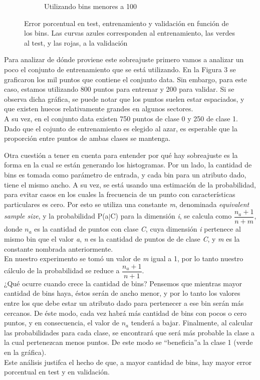 \documentclass[12pt, a4paper]{article}
\begin{document}
\begin{figure}
\begin{subfigure}[b]{0.45\textwidth}
        \caption{Utilizando bins menores a 100}
    \end{subfigure}
    \caption{Error porcentual en test, entrenamiento y validación en función de los bins. Las curvas azules corresponden al entrenamiento, las verdes al test, y las rojas, a la validación}
\end{figure}

\bigskip

Para analizar de dónde proviene este sobreajuste primero vamos a analizar un poco el conjunto de entrenamiento que se está utilizando. En la Figura 3 se graficaron los mil puntos que contiene el conjunto data. Sin embargo, para este caso, estamos utilizando 800 puntos para entrenar y 200 para validar. Si se observa dicha gráfica, se puede notar que los puntos suelen estar espaciados, y que existen huecos relativamente grandes en algunos sectores. \\
A su vez, en el conjunto data existen 750 puntos de clase 0 y 250 de clase 1. Dado que el cojunto de entrenamiento es elegido al azar, es esperable que la proporción entre puntos de ambas clases se mantenga.


\bigskip

Otra cuestión a tener en cuenta para entender por qué hay sobreajuste es la forma en la cual se están generando los histogramas. Por un lado, la cantidad de bins es tomada como parámetro de entrada, y cada bin para un atributo dado, tiene el mismo ancho. A su vez, se está usando una estimación de la probabilidad, para evitar casos en los cuales la frecuencia de un punto con características particulares es cero. Por esto se utiliza una constante \textit{m}, denominada \textit{equivalent sample size}, y la probabilidad P(a$|$C) para la dimensión \textit{i}, se calcula como $\dfrac{n_{a} + 1} {n + m}$, donde \textit{$n_{a}$} es la cantidad de puntos con clase \textit{C}, cuya dimensión \textit{i} pertenece al mismo bin que el valor \textit{a}, \textit{n} es la cantidad de puntos de de clase \textit{C}, y \textit{m} es la constante nombrada anteriormente.\\
En nuestro experimento se tomó un valor de \textit{m} igual a 1, por lo tanto nuestro cálculo de la probabilidad se reduce a $\dfrac{n_{a} + 1} {n + 1}$.\\
¿Qué ocurre cuando crece la cantidad de bins? Pensemos que mientras mayor cantidad de bins haya, éstos serán de ancho menor, y por lo tanto los valores entre los que debe estar un atributo dado para pertenecer a ese bin serán más cercanos. De éste modo, cada vez habrá más cantidad de bins con pocos o cero puntos, y en consecuencia, el valor de \textit{$n_{a}$} tenderá a bajar. Finalmente, al calcular las probabilidades para cada clase, se encontrará que será más probable la clase a la cual pertenezcan menos puntos. De este modo se \textquotedblleft beneficia\textquotedblright a la clase 1 (verde en la gráfica).\\
Este análisis justifca el hecho de que, a mayor cantidad de bins, hay mayor error porcentual en test y en validación.
\end{document}
